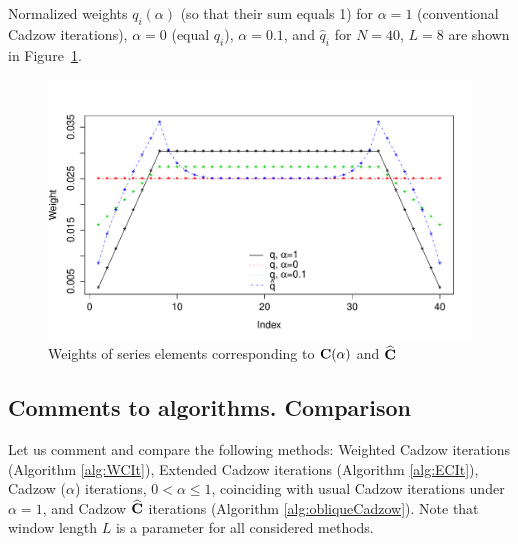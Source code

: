 \documentclass[12pt,a4paper,fleqn,leqno]{article}
\begin{document}
Normalized weights $q_i(\alpha)$ (so that their sum equals 1) for $\alpha = 1$ (conventional Cadzow iterations), $\alpha = 0$ (equal $q_i$), $\alpha = 0.1$,
 and $\hat{q}_i$ for $N = 40$, $L = 8$ are shown in Figure~\ref{img_weights}.
\begin{figure}[!h] \begin{center}
\includegraphics[width = \textwidth]{weights.pdf}\caption{Weights of series elements corresponding to $\mathbf{C}(\alpha)$ and $\widehat {\mathbf{C}}$}\label{img_weights}
\end{center}\end{figure}

\subsection{Comments to algorithms. Comparison}

Let us comment and compare the following methods: Weighted Cadzow iterations (Algorithm \ref{alg:WCIt}), Extended Cadzow iterations (Algorithm \ref{alg:ECIt}), Cadzow ($\alpha$) iterations, $0< \alpha \leq 1$, coinciding with usual Cadzow iterations under $\alpha=1$,
and Cadzow $\widehat {\mathbf{C}}$ iterations (Algorithm \ref{alg:obliqueCadzow}).
Note that window length $L$ is a parameter for all considered methods.
\end{document}
